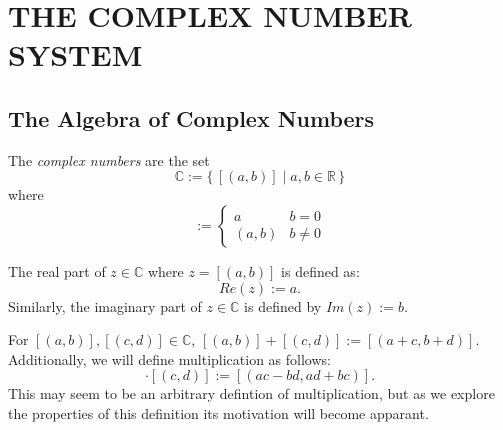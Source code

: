 \documentclass{refbook}
\begin{document}
  \section{THE COMPLEX NUMBER SYSTEM}
  \subsection{The Algebra of Complex Numbers}
    \begin{definition} 
      \label{def:cmpnum}
      The \emph{complex numbers} are the set
      \begin{equation*}
        \mathbb{C} := \{\,[(a,b)] \mid a,b \in \mathbb{R}\,\}
      \end{equation*}
      where
      \begin{equation*}
        [(a,b)] :=
        \begin{cases}
          a & b = 0 \\
          (a,b) & b \neq 0
        \end{cases}
      \end{equation*}
    \end{definition}
    \begin{definition} 
      The real part of $z \in \mathbb{C}$ where $z=[(a,b)]$ is defined as:
      \begin{equation*}
        Re(z) := a.
      \end{equation*}
      Similarly, the imaginary part of $z \in \mathbb{C}$ is defined by $Im(z):=b$.
    \end{definition}
    \begin{definition} 
      For $[(a,b)],[(c,d)]\in \mathbb{C}$, $[(a,b)]+[(c,d)]:=[(a+c,b+d)]$. Additionally, we will define multiplication as follows:
      \begin{equation*}
        [(a,b)]\cdot[(c,d)] := [(ac - bd, ad + bc)].
      \end{equation*}
      This may seem to be an arbitrary defintion of multiplication, but as we explore the properties of this definition its motivation will become apparant.
    \end{definition}
\end{document}
